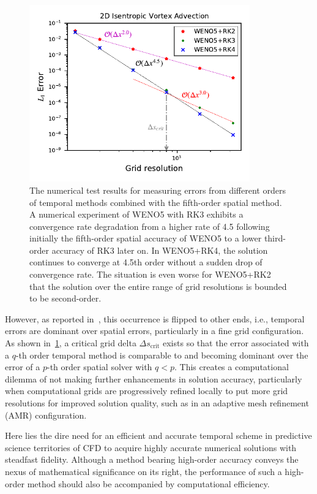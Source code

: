 \begin{figure}
    \centering
    \includegraphics[width=0.85\textwidth]{fig/weno5_vortex_error_sat}
    \caption{The numerical test results for measuring errors from
        different orders of temporal methods combined with the fifth-order spatial method.
        A numerical experiment of WENO5 with RK3 exhibits
        a convergence rate degradation from a higher rate of 4.5
        following initially the fifth-order spatial accuracy of WENO5
        to a lower third-order accuracy of RK3 later on.
        In WENO5+RK4, the solution continues to converge at 4.5th order without
        a sudden drop of convergence rate. The situation is even worse for WENO5+RK2 that
        the solution over the entire range of grid resolutions is bounded to be second-order.
    }\label{fig:vortex_error_saturation}
\end{figure}
However, as reported in~\cite{lee2021recursive}, this occurrence is flipped to other ends,
i.e., temporal errors are dominant over spatial errors,
particularly in a fine grid configuration.
As shown in~\cref{fig:vortex_error_saturation}, a critical grid delta \( \Delta s_{\text{crit}} \)
exists so that the error associated with a \( q \)-th order temporal method
is comparable to and becoming dominant over the error of a \( p \)-th order spatial solver
with \( q < p \). This creates a computational dilemma of not making further enhancements
in solution accuracy, particularly when computational grids are progressively refined locally
to put more grid resolutions for improved solution quality,
such as in an adaptive mesh refinement (AMR) configuration.

Here lies the dire need for an efficient and accurate temporal scheme
in predictive science territories of CFD to acquire highly accurate numerical solutions with steadfast fidelity.
Although a method bearing high-order accuracy conveys the nexus of mathematical significance
on its right, the performance of such a high-order method should also be accompanied by computational efficiency.


